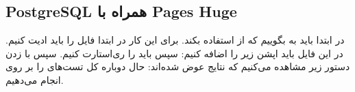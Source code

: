 \subsection{PostgreSQL همراه با Pages Huge}
در ابتدا باید به
بگوییم که از
استفاده بکند. برای این کار در ابتدا فایل
\linebreak
{}
را باید ادیت کنیم. در این فایل باید اپشن زیر را اضافه کنیم:
سپس باید
را ری‌استارت کنیم.
سپس با زدن دستور زیر مشاهده می‌کنیم که نتایج عوض شده‌اند:
حال دوباره کل تست‌های
را بر روی
انجام می‌دهیم.

